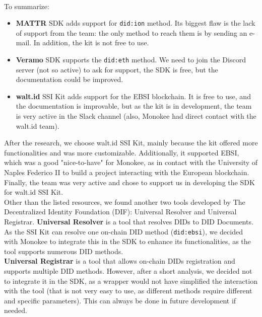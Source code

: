 \vspace{-0.5cm}\\
To summarize:
\begin{itemize}
    \item \textbf{MATTR} SDK adds support for \texttt{did:ion} method. Its biggest flaw is 
    the lack of support from the team: the only method to reach them is by sending an e-mail. 
    In addition, the kit is not free to use.
    \item \textbf{Veramo} SDK supports the \texttt{did:eth} method. We need to join the
    Discord server (not so active) to ask for support, the SDK is free, but the 
    documentation could be improved.
    \item \textbf{walt.id} SSI Kit adds support for the EBSI blockchain. It is free to 
    use, and the documentation is improvable, but as the kit is in development, the 
    team is very active in the Slack channel (also, Monokee had direct contact with the
    walt.id team).
\end{itemize}
After the research, we choose walt.id SSI Kit, mainly because the kit offered more 
functionalities and was more customizable. Additionally, it supported EBSI, which was 
a good "nice-to-have" for Monokee, as in contact with the University of Naples 
Federico II to build a project interacting with the European blockchain.\\
Finally, the team was very active and chose to support us in developing the SDK for 
walt.id SSI Kit.\\
Other than the listed resources, we found another two tools developed by The Decentralized 
Identity Foundation (DIF)\cite{site:dif}: Universal Resolver and Universal Registrar.
\textbf{Universal Resolver}\cite{site:unires} is a tool that resolves DIDs to DID Documents. As the SSI Kit can 
resolve one on-chain DID method (\texttt{did:ebsi}), we decided with Monokee to
integrate this in the SDK to enhance its functionalities, as the tool supports
numerous DID methods.\\
\textbf{Universal Registrar}\cite{site:unireg} is a tool that allows on-chain DIDs registration and
supports multiple DID methods. However, after a short analysis, we decided not to
integrate it in the SDK, as a wrapper would not have simplified the interaction
with the tool (that is not very easy to use, as different methods require different
and specific parameters). This can always be done in future development if needed.

